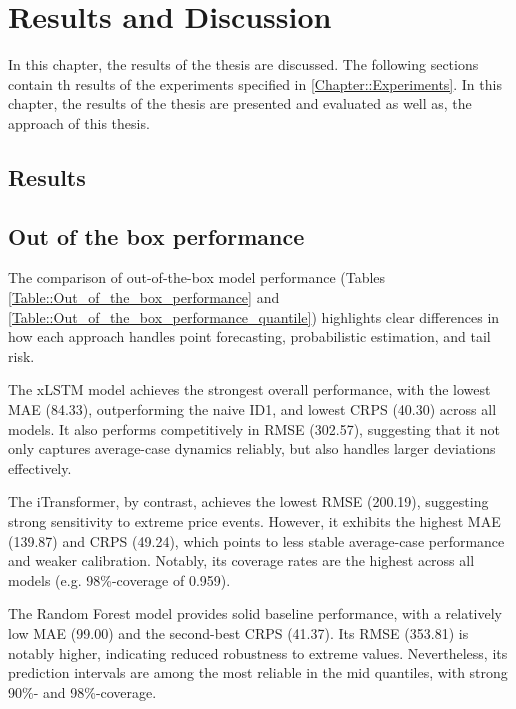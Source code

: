 \documentclass[class=scrbook, crop=false]{standalone}
\begin{document}
\chapter{Results and Discussion} %
\label{Chapter::Results and Discussion}
In this chapter, the results of the thesis are discussed. The following sections contain th results of the experiments specified in \ref{Chapter::Experiments}.                   
    In this chapter, the results of the thesis are presented and evaluated as well as, the approach of this thesis.

\section{Results}
\label{Section::Results}

\section{Out of the box performance}

The comparison of out-of-the-box model performance (Tables \ref{Table::Out_of_the_box_performance} and \ref{Table::Out_of_the_box_performance_quantile}) highlights clear differences in how each approach handles point forecasting, probabilistic estimation, and tail risk.

The xLSTM model achieves the strongest overall performance, with the lowest MAE (84.33), outperforming the naive ID1, and lowest CRPS (40.30) across all models. It also performs competitively in RMSE (302.57), suggesting that it not only captures average-case dynamics reliably, but also handles larger deviations effectively.

The iTransformer, by contrast, achieves the lowest RMSE (200.19), suggesting strong sensitivity to extreme price events. However, it exhibits the highest MAE (139.87) and CRPS (49.24), which points to less stable average-case performance and weaker calibration. Notably, its coverage rates are the highest across all models (e.g. 98\%-coverage of 0.959).

The Random Forest model provides solid baseline performance, with a relatively low MAE (99.00) and the second-best CRPS (41.37). Its RMSE (353.81) is notably higher, indicating reduced robustness to extreme values. Nevertheless, its prediction intervals are among the most reliable in the mid quantiles, with strong 90\%- and 98\%-coverage.
\end{document}

